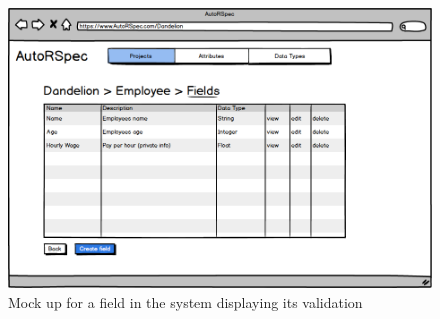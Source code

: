 \documentclass[a4paper,12pt]{article}
\begin{document}
\begin{figure}
\includegraphics[width=\linewidth]{screenshots/mutablefields}
\caption{Mock up for a field in the system displaying its validation}
\label{fig:mu3}
\end{figure}
\end{document}

